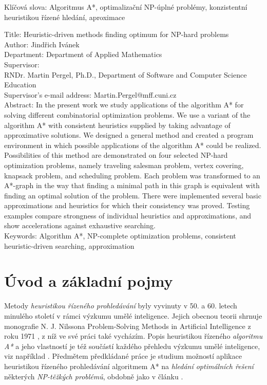 \documentclass[12pt,notitlepage,fleqn]{report} %
\theoremstyle{definition}
\begin{document}
\noindent Klíčová slova: Algoritmus A*, optimalizační NP-úplné problémy, konzistentní heuristikou řízené hledání, aproximace

\eject

\noindent
Title: Heuristic-driven methods finding optimum for NP-hard problems\\
Author: Jindřich Ivánek\\
Department: Department of Applied Mathematics\\
Supervisor: \\
RNDr. Martin Pergel, Ph.D., Department of Software and Computer Science Education\\
Supervisor's e-mail address: Martin.Pergel@mff.cuni.cz\\

\noindent Abstract: In the present work we study applications of the algorithm A* for solving different combinatorial optimization problems. We use a variant of the algorithm A* with consistent heuristics supplied by taking advantage of approximative solutions.
We designed a general method and created  a program environment in which possible applications of the algorithm A* could be realized. Possibilities of this method are demonstrated on four selected NP-hard optimization problems, namely traveling salesman problem, vertex covering, knapsack problem, and scheduling problem.
Each problem was transformed to an A*-graph in the way that finding a minimal path in this graph is equivalent with finding an optimal solution of the problem. There were implemented several basic approximations and heuristics for which their consistency was proved. Testing examples compare strongness of individual heuristics and approximations, and show accelerations against exhaustive searching. \\

\noindent Keywords: Algorithm A*, NP-complete optimization problems, consistent heuristic-driven searching, approximation

\newpage

\chapter{Úvod a základní pojmy}

  Metody \emph{heuristikou řízeného prohledávání} byly vyvinuty v 50. a 60. letech minulého století v rámci výzkumu umělé inteligence. Jejich obecnou teorii shrnuje monografie N. J. Nilssona Problem-Solving Methods in Artificial Intelligence z roku 1971 \cite{nilsson}, z níž ve své práci také vycházím. Popis heuristikou řízeného \emph{algoritmu A*} a jeho vlastností je též součástí každého přehledu výzkumu umělé inteligence, viz například \cite{russel}. Předmětem předkládané práce je studium možností aplikace heuristikou řízeného prohledávání algoritmem A* na \emph{hledání optimálních řešení} některých \emph{NP-těžkých problémů}, obdobně jako v článku \cite{ivanek}.
  
\end{document}
